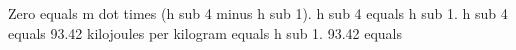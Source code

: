 Zero equals m dot times (h sub 4 minus h sub 1).  
h sub 4 equals h sub 1.  
h sub 4 equals 93.42 kilojoules per kilogram equals h sub 1.  
93.42 equals